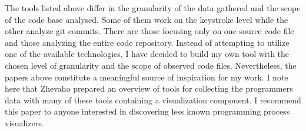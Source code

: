 The tools listed above differ in the granularity of the data gathered and the scope of the code base analysed. Some of them work on the keystroke level while the other analyze git commits. There are those focusing only on one source code file and those analyzing the entire code repository. Instead of attempting to utilize one of the available technologies, I have decided to build my own tool with the chosen level of granularity and the scope of observed code files. Nevertheless, the papers above constitute a meaningful source of inspiration for my work. I note here that Zhevaho \cite{Zhe21OverviewCol} prepared an overview of tools for collecting the programmers data with many of these tools containing a visualization component. I recommend this paper to anyone interested in discovering less known programming process visualizers.
